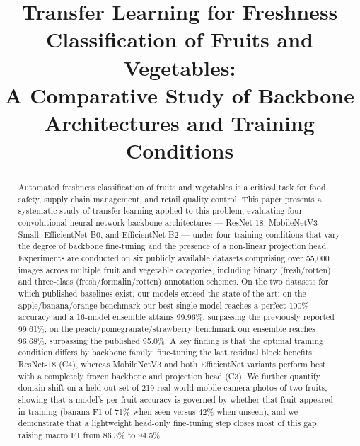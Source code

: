 \documentclass[conference]{IEEEtran}
\begin{document}
\title{Transfer Learning for Freshness Classification of Fruits and Vegetables:\\
A Comparative Study of Backbone Architectures and Training Conditions}

\author{
}

\maketitle

\begin{abstract}
Automated freshness classification of fruits and vegetables is a
critical task for food safety, supply chain management, and retail
quality control.
This paper presents a systematic study of transfer learning applied to
this problem, evaluating four convolutional neural network backbone
architectures --- ResNet-18, MobileNetV3-Small, EfficientNet-B0, and
EfficientNet-B2 --- under four training conditions that vary the degree
of backbone fine-tuning and the presence of a non-linear projection head.
Experiments are conducted on six publicly available datasets comprising
over 55,000 images across multiple fruit and vegetable categories,
including binary (fresh/rotten) and three-class (fresh/formalin/rotten)
annotation schemes.
On the two datasets for which published baselines exist, our models
exceed the state of the art: on the apple/banana/orange benchmark our
best single model reaches a perfect 100\% accuracy and a 16-model
ensemble attains 99.96\%, surpassing the previously reported 99.61\%;
on the peach/pomegranate/strawberry benchmark our ensemble reaches
96.68\%, surpassing the published 95.0\%.
A key finding is that the optimal training condition differs by backbone
family: fine-tuning the last residual block benefits ResNet-18 (C4),
whereas MobileNetV3 and both EfficientNet variants perform best with a
completely frozen backbone and projection head (C3).
We further quantify domain shift on a held-out set of 219 real-world
mobile-camera photos of two fruits, showing that a model's per-fruit
accuracy is governed by whether that fruit appeared in training
(banana F1 of 71\% when seen versus 42\% when unseen), and we demonstrate
that a lightweight head-only fine-tuning step closes most of this gap,
raising macro F1 from 86.3\% to 94.5\%.
\end{abstract}
\end{document}
